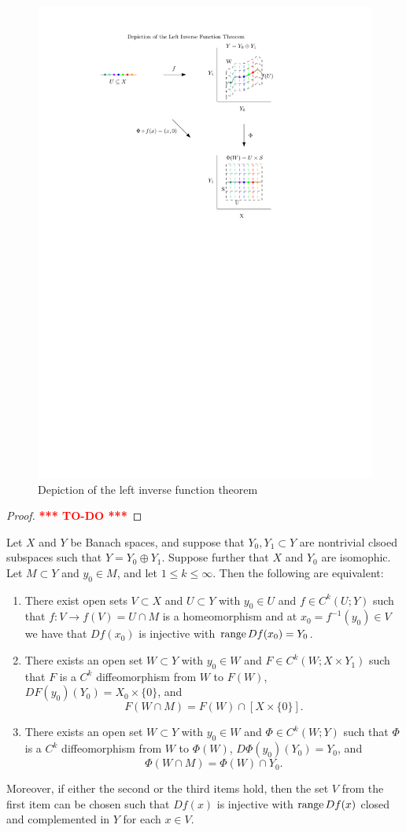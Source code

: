 \documentclass[a4paper]{article}
\newcommand{\TODO}{\textcolor{red}{\textbf{*** TO-DO ***}}}
\begin{document}
\begin{figure}[h!]
  \centering
  \includegraphics[width=0.55\linewidth]{fig/left_inverse.pdf}
  \caption{Depiction of the left inverse function theorem}
\end{figure}

\begin{proof}
\TODO
\end{proof}

\begin{thm}
Let $X$ and $Y$ be Banach spaces, and suppose that
$Y_0, Y_1 \subset Y$ are nontrivial clsoed subspaces
such that $Y = Y_0 \oplus Y_1$. Suppose further that
$X$ and $Y_0$ are isomophic. Let $M \subset Y$ and
$y_0 \in M$, and let $1 \leq k \leq \infty$. Then the
following are equivalent:
\begin{enumerate}
\item There exist open sets $V \subset X$ and $U \subset Y$
with $y_0 \in U$ and $f \in C^k(U ; Y)$ such that $f :
V \to f(V) = U \cap M$ is a homeomorphism and at $x_0
= f^{-1}(y_0) \in V$ we have that $Df(x_0)$ is injective
with $\operatorname{range} Df(x_0) = Y_0$.

\item There exists an open set $W \subset Y$ with $y_0 \in W$
and $F \in C^k(W ; X \times Y_1)$ such that $F$ is a
$C^k$ diffeomorphism from $W$ to $F(W)$, $DF(y_0)(Y_0)
= X_0 \times \{0\}$, and
\[
F(W \cap M) = F(W) \cap [X \times \{0\}].
\]

\item There exists an open set $W \subset Y$ with $y_0 \in W$
and $\Phi \in C^k(W ; Y)$ such that $\Phi$ is a $C^k$
diffeomorphism from $W$ to $\Phi(W)$, $D \Phi(y_0) (Y_0)
= Y_0$, and
\[
\Phi(W \cap M) = \Phi(W) \cap Y_0.
\]
\end{enumerate}

Moreover, if either the second or the third items hold, then
the set $V$ from the first item can be chosen such that
$Df(x)$ is injective with $\operatorname{range} Df(x)$ closed and
complemented in $Y$ for each $x \in V$.
\end{thm}
\end{document}
